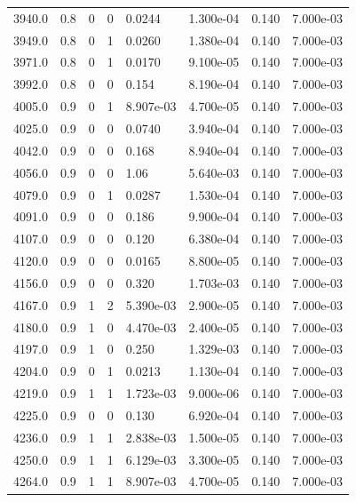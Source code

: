 \documentclass[preview]{standalone}
\begin{document}
{{{{{{{{\begin{tabular}{L{1.2cm}C{1.2cm} C{0.3cm}C{0.5cm} C{1.4cm}C{1.4cm} C{1.4cm}C{1.4cm}}
  3940.0  &   0.8  & 0     &  0 &  0.0244  & 1.300e-04  & 0.140 &  7.000e-03   \\ 
  3949.0  &   0.8  & 0     &  1 &  0.0260  & 1.380e-04  & 0.140 &  7.000e-03   \\ 
  3971.0  &   0.8  & 0     &  1 &  0.0170  & 9.100e-05  & 0.140 &  7.000e-03   \\ 
  3992.0  &   0.8  & 0     &  0 &  0.154  & 8.190e-04  & 0.140 &  7.000e-03   \\ 
  4005.0  &   0.9  & 0     &  1 &  8.907e-03  & 4.700e-05  & 0.140 &  7.000e-03   \\ 
  4025.0  &   0.9  & 0     &  0 &  0.0740  & 3.940e-04  & 0.140 &  7.000e-03   \\ 
  4042.0  &   0.9  & 0     &  0 &  0.168  & 8.940e-04  & 0.140 &  7.000e-03   \\ 
  4056.0  &   0.9  & 0     &  0 &  1.06  & 5.640e-03  & 0.140 &  7.000e-03   \\ 
  4079.0  &   0.9  & 0     &  1 &  0.0287  & 1.530e-04  & 0.140 &  7.000e-03   \\ 
  4091.0  &   0.9  & 0     &  0 &  0.186  & 9.900e-04  & 0.140 &  7.000e-03   \\ 
  4107.0  &   0.9  & 0     &  0 &  0.120  & 6.380e-04  & 0.140 &  7.000e-03   \\ 
  4120.0  &   0.9  & 0     &  0 &  0.0165  & 8.800e-05  & 0.140 &  7.000e-03   \\ 
  4156.0  &   0.9  & 0     &  0 &  0.320  & 1.703e-03  & 0.140 &  7.000e-03   \\ 
  4167.0  &   0.9  & 1     &  2 &  5.390e-03  & 2.900e-05  & 0.140 &  7.000e-03   \\ 
  4180.0  &   0.9  & 1     &  0 &  4.470e-03  & 2.400e-05  & 0.140 &  7.000e-03   \\ 
  4197.0  &   0.9  & 1     &  0 &  0.250  & 1.329e-03  & 0.140 &  7.000e-03   \\ 
  4204.0  &   0.9  & 0     &  1 &  0.0213  & 1.130e-04  & 0.140 &  7.000e-03   \\ 
  4219.0  &   0.9  & 1     &  1 &  1.723e-03  & 9.000e-06  & 0.140 &  7.000e-03   \\ 
  4225.0  &   0.9  & 0     &  0 &  0.130  & 6.920e-04  & 0.140 &  7.000e-03   \\ 
  4236.0  &   0.9  & 1     &  1 &  2.838e-03  & 1.500e-05  & 0.140 &  7.000e-03   \\ 
  4250.0  &   0.9  & 1     &  1 &  6.129e-03  & 3.300e-05  & 0.140 &  7.000e-03   \\ 
  4264.0  &   0.9  & 1     &  1 &  8.907e-03  & 4.700e-05  & 0.140 &  7.000e-03   \\ 

\end{tabular}}}}}}}}}
\end{document}
